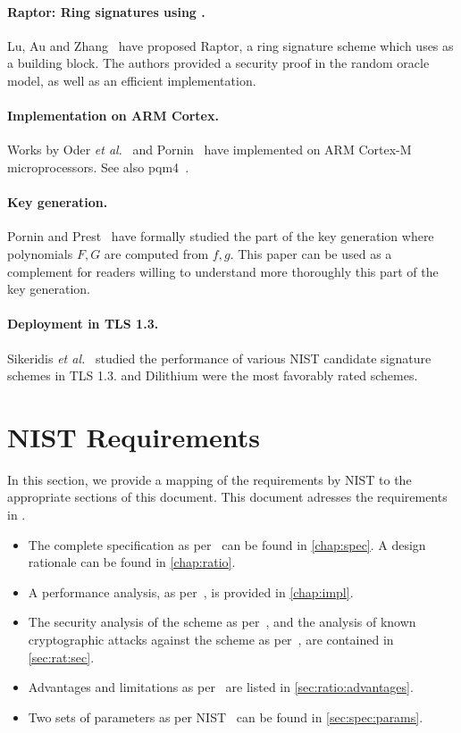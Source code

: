 \paragraph{Raptor: Ring signatures using \falcon.}  Lu, Au and Zhang~\cite{EPRINT:LuAuZha18} have proposed Raptor, a ring signature scheme which uses \falcon as a building block. The authors provided a security proof in the random oracle model, as well as an efficient implementation.

\paragraph{Implementation on ARM Cortex.} Works by Oder \textit{et al.}~\cite{PQCRYPTO:OSHG19} and Pornin~\cite{EPRINT:Pornin19} have implemented \falcon on ARM Cortex-M microprocessors. See also pqm4~\cite{EPRINT:KRSS19}. 

\paragraph{Key generation.} Pornin and Prest~\cite{PKC:PorPre19} have formally studied the part of the key generation where polynomials $F,G$ are computed from $f,g$.
This paper can be used as a complement for readers willing to understand more thoroughly this part of the key generation.

\paragraph{Deployment in TLS 1.3.} Sikeridis \textit{et al.}~\cite{NDSS:SikKamDev20} studied the performance of various NIST candidate signature schemes in TLS 1.3. \falcon and Dilithium were the most favorably rated schemes.

\section{NIST Requirements}

In this section, we provide a mapping of the requirements by NIST to the appropriate sections of this document. This document adresses the requirements in \cite[Section 2.B]{NIST}.
 \begin{itemize}
  \item The complete specification as per~\cite[Section 2.B.1]{NIST} can be found in \cref{chap:spec}. A design rationale can be found in \cref{chap:ratio}.
  \item A performance analysis, as per~\cite[Section 2.B.2]{NIST}, is provided in \cref{chap:impl}.
  \item The security analysis of the scheme as per~\cite[Section 2.B.4]{NIST}, and the analysis of known cryptographic attacks against the scheme as per~\cite[Section 2.B.5]{NIST}, are contained in \cref{sec:rat:sec}.
  \item Advantages and limitations as per~\cite[Section 2.B.6]{NIST} are listed in \cref{sec:ratio:advantages}.
  \item Two sets of parameters as per NIST~\cite[Section 4.A.5]{NIST} can be found in \cref{sec:spec:params}.
 \end{itemize}
 
